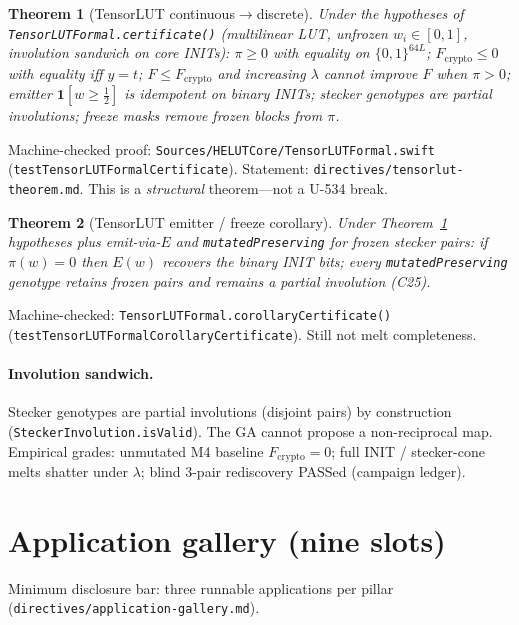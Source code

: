 \documentclass[11pt,a4paper]{article}
\newtheorem{theorem}{Theorem}
\begin{document}
\begin{theorem}[TensorLUT continuous$\to$discrete]
\label{thm:tensorlut}
Under the hypotheses of \texttt{TensorLUTFormal.certificate()}
(multilinear LUT, unfrozen $w_i\in[0,1]$, involution sandwich on core INITs):
$\pi\ge 0$ with equality on $\{0,1\}^{64L}$;
$F_{\mathrm{crypto}}\le 0$ with equality iff $y=t$;
$F\le F_{\mathrm{crypto}}$ and increasing $\lambda$ cannot improve $F$ when $\pi>0$;
emitter $\mathbf{1}[w\ge\tfrac12]$ is idempotent on binary INITs;
stecker genotypes are partial involutions;
freeze masks remove frozen blocks from $\pi$.
\end{theorem}

Machine-checked proof: \texttt{Sources/HELUTCore/TensorLUTFormal.swift}
(\texttt{testTensorLUTFormalCertificate}). Statement: \texttt{directives/tensorlut-theorem.md}.
This is a \emph{structural} theorem---not a U-534 break.

\begin{theorem}[TensorLUT emitter / freeze corollary]
\label{thm:tensorlut-corollary}
Under Theorem~\ref{thm:tensorlut} hypotheses plus emit-via-$E$ and
\texttt{mutatedPreserving} for frozen stecker pairs:
if $\pi(w)=0$ then $E(w)$ recovers the binary INIT bits;
every \texttt{mutatedPreserving} genotype retains frozen pairs and remains a
partial involution (C25).
\end{theorem}

Machine-checked: \texttt{TensorLUTFormal.corollaryCertificate()}
(\texttt{testTensorLUTFormalCorollaryCertificate}).
Still not melt completeness.

\paragraph{Involution sandwich.}
Stecker genotypes are partial involutions (disjoint pairs) by construction
(\texttt{SteckerInvolution.isValid}). The GA cannot propose a non-reciprocal map.
Empirical grades: unmutated M4 baseline $F_{\mathrm{crypto}}=0$; full INIT /
stecker-cone melts shatter under $\lambda$; blind 3-pair rediscovery PASSed
(campaign ledger).

\section{Application gallery (nine slots)}
\label{sec:apps-gallery}

Minimum disclosure bar: three runnable applications per pillar
(\texttt{directives/application-gallery.md}).
\end{document}
